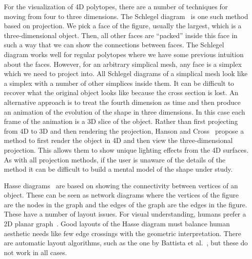 For the visualization of 4D polytopes, there are a number of techniques for moving from four to three dimensions.  The
Schlegel diagram~\cite{Sommerville:1929} is one such method based on
projection. We pick a face of the figure, usually the largest, which is a
three-dimensional object. Then, all other faces are ``packed'' inside this face in
such a way that we can show the connections between faces. The Schlegel diagram
works well for regular polytopes where we have some previous intuition about
the faces. However, for an arbitrary simplical mesh, any face is a simplex
which we need to project into. All Schlegel diagrams of a simplical mesh look
like a simplex with a number of other simplices inside them. It can be
difficult to recover what the original object looks like because the
cross section is lost. An alternative approach is to treat the fourth dimension
as time and then produce an animation of the evolution of the shape in three
dimensions. In this case each frame of the animation is a 3D slice of the 
object. Rather than first projecting from 4D to 3D and then rendering the
projection, Hanson and Cross~\cite{Hanson:1993} propose a method to first
render the object in 4D and then view the three-dimensional projection. This
allows them to show unique lighting effects from the 4D surfaces.
As with all projection methods, if the user is unaware of the details of the
method it can be difficult to build a mental model of the shape under study.

Hasse diagrams~\cite{Battista:1988} are based on showing the connectivity
between vertices of an object. These can be seen as network diagrams where the
vertices of the figure are the nodes in the graph and the edges of the graph
are the edges in the figure. These have a number of layout issues.  For visual
understanding, humans prefer a 2D planar graph~\cite{Kieffer:2016}. Good layouts
of the Hasse diagram must balance human aesthetic needs like few edge crossings
with the geometric interpretation. 
There are automatic layout
algorithms, such as the one by Battista et al.~\cite{Battista:1988}, but these
do not work in all cases.

